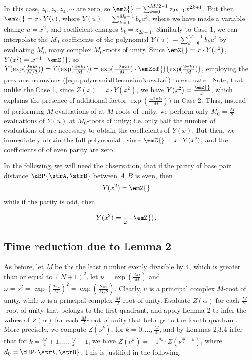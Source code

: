 \noindent
In this case, $z_0,z_2,z_4,\cdots$ are zero, so
$\emZ{} = \sum_{k=0}^{M/2-1} z_{2k+1} x^{2k+1}$. But then
$\emZ{} = x \cdot Y(u)$, where
$Y(u)= \sum_{k=0}^{M_0-1} b_k u^k$, where we have made
a variable change $u=x^2$, and coefficient changes
$b_k = z_{2k+1}$. Similarly to Case 1,
we can interpolate the $M_0$ coefficients of the polynomial
$Y(u) = \displaystyle\sum_{k=0}^{M_0-1} b_k u^k$
by evaluating $M_0$ many complex $M_0$-roots
of unity.  Since $\emZ{}=x \cdot Y(x^2)$, $Y(x^2) = x^{-1} \cdot \emZ{}$,
so
$Y(\exp(\frac{2\pi ki}{M/2})) = Y(\exp(\frac{4\pi ki}{M})) =
\exp(\frac{-2\pi ki}{M}) \cdot
\emZof{}{\exp(\frac{2\pi ki}{M})}$, employing
the previous recursions (\ref{eqn:polynomialRecursionNussJac})
to evaluate .  Note, that unlike the
Case 1, since $Z(x)=x \cdot Y(x^2)$, we have
$Y(x^2)=\frac{\emZ{}}{x}$, which explains the presence of additional factor
$\exp(\frac{-2\pi ki}{M}))$ in Case 2.  Thus, instead of
performing $M$ evaluations of \emZ{} at $M$-roots of unity,
we perform only $M_0=\frac{M}{2}$ evaluations of $Y(u)$ at
$M_0$-roots of unity; i.e. only half the number of
evaluations of \emZ{} are necessary to
obtain the coefficients of $Y(x)$. But then, we immediately obtain the
full polynomial \emZ{}, since $\emZ{} = x \cdot Y(x^2)$, and the
coefficients of \emZ{} of even parity are zero.

In the following, we will need the observation, that if the parity of
base pair distance $\dBP{\strA,\strB}$ between $A,B$ is
even, then
\begin{align}
\label{eqn:evenY}
Y(x^2) = \emZ{}
\end{align}
while if the parity is odd,
then
\begin{align}
\label{eqn:oddY}
Y(x^2) = \frac{1}{x} \cdot \emZ{}.
\end{align}

\subsection{Time reduction due to Lemma 2}
As before, let $M$ be the the least number evenly divisible by $4$, which is
greater than or equal to $(N+1)^2$, let $\nu = \exp(\frac{2 \pi i}{M})$
and $\omega=\nu^2 = \exp(\frac{2 \pi i}{M})^2 =
\exp(\frac{2 \pi i}{M/2})$. Clearly, $\nu$ is a principal complex
$M$-root of unity, while $\omega$ is a principal complex $\frac{M}{2}$-root
of unity. Evaluate $Z(\alpha)$ for each $\frac{M}{2}$-root of unity
that belongs to the first quadrant, and apply Lemma 2 to infer the values
of $Z(\alpha)$ for each $\frac{M}{2}$-root of unity that belongs to the
fourth quadrant. More precisely,
we compute $Z(\nu^k)$, for $k=0,\ldots,\frac{M}{4}$, and by Lemmas 2,3,4 infer
that for $k=\frac{M}{4}+1,\ldots,\frac{M}{2}-1$, we have
$Z(\nu^{k})= -1^{d_0} \cdot \overline{Z(\nu^{\frac{M}{2}-k})}$, where
$d_0 = \dBP{\strA,\strB}$. This is justified in the following.

